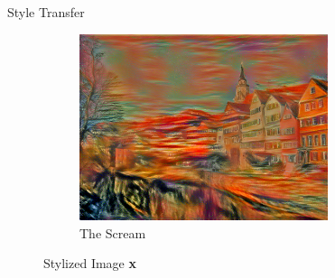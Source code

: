 \documentclass{beamer}
\begin{document}
\begin{frame}{Style Transfer}
\begin{figure}
{\begin{figure}[ht]
    \end{figure}
}{
    \begin{figure}[ht]
    \centering
    \caption*{The Scream}
    \includegraphics[width=0.8\textwidth,height=0.27\textheight]{img/transfer/the-scream}
    \end{figure}
}
\caption*{Stylized Image \textbf{x}}
\end{figure}
\end{frame}
\end{document}
